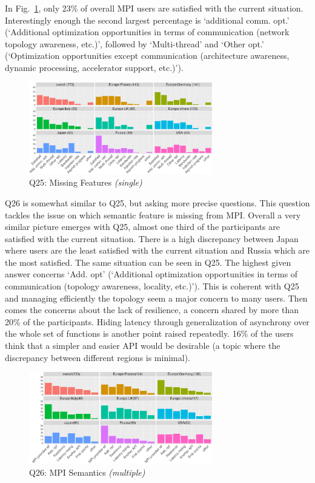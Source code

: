 \documentclass[conference,10pt,letterpaper]{IEEEtran}
\def\myquote#1{`#1'}
\begin{document}
In Fig.~\ref{fig:missing-features}, only 23\% of overall MPI users
are satisfied with the current situation.
Interestingly enough the second largest percentage is
\myquote{additional comm. opt.} (\myquote{Additional optimization
  opportunities in terms of communication (network topology awareness,
  etc.)}, followed by \myquote{Multi-thread} and \myquote{Other
  opt.} (\myquote{Optimization opportunities except communication
  (architecture awareness, dynamic processing, accelerator support,
  etc.)}). 

\begin{figure}[htb]
\begin{center}
\includegraphics[width=8cm]{R-scripts/Q25.pdf}
\caption{Q25: Missing Features {\it(single)}}
\label{fig:missing-features}
\end{center}
\end{figure}

Q26 is somewhat similar to Q25, but asking more precise questions.
This question tackles the issue on which semantic 
feature is missing from MPI. Overall a very similar picture emerges
with Q25,
almost one third of the participants are satisfied with the current
situation. There is a high discrepancy between Japan where users are
the least satisfied with the current situation and Russia which are the most
satisfied. The same situation can be seen in Q25. The highest given
answer concerns \myquote{Add. opt} (\myquote{Additional optimization
  opportunities in terms of communication (topology awareness,
  locality, etc.)}). This is coherent with Q25 and managing
efficiently the topology seem a major concern to many users. Then
comes the concerns about the lack of 
resilience, a concern shared by more than 20\% of the
participants. Hiding latency through generalization of asynchrony over
the whole set of functions is another point raised repeatedly. 16\% of
the users think that a simpler and easier API would be 
 desirable (a topic where the discrepancy between different regions is
 minimal). 

\begin{figure}[htb]
\begin{center}
\includegraphics[width=8cm]{R-scripts/Q26.pdf}
\caption{Q26: MPI Semantics {\it(multiple)}}
\label{fig:missing-semantics}
\end{center}
\end{figure}
\end{document}
